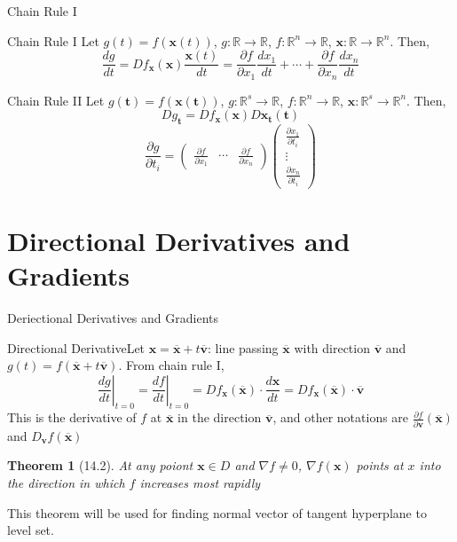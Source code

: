 \documentclass[a4paper,11pt]{article}
\newtheorem{thm}{Theorem}
\newcommand{\bb}{\mathbb}
\newcommand{\bd}{\mathbf}
\newcommand{\p}{\partial}
\begin{document}
\begin{frame}[t]{Chain Rule I}
	\begin{block}
		{Chain Rule I}
		Let $g(t)=f(\bd{x}(t))$, $g:\bb{R}\rightarrow\bb{R}$, $f:\bb{R}^n\rightarrow\bb{R}$, $\bd x :\bb{R}\rightarrow\bb{R}^n$. Then, \[
			\frac{d g}{dt} = Df_{\bd x}(\bd x) \frac {\bd x(t)}{dt} = \frac{\p f}{\p x_1}\frac{dx_1}{dt}+ \cdots +\frac{\p f}{\p x_n}\frac{dx_n}{dt}
		\]
	\end{block}
	\begin{block}
		{Chain Rule II}
		Let $g(\bd t)=f(\bd{x}(\bd t))$, $g:\bb{R}^s\rightarrow\bb{R}$, $f:\bb{R}^n\rightarrow\bb{R}$, $\bd x :\bb{R}^s\rightarrow\bb{R}^n$. Then, \[
			Dg_{\bd t} = Df_{\bd x}(\bd x) D {\bd x_{\bd t}(\bd t)} 
			\]\[
				\frac{\p g}{\p t_i} = \begin{pmatrix}
					\frac{\p f}{\p x_1} & \cdots & \frac{\p f}{\p x_n}
				\end{pmatrix}\begin{pmatrix}
					\frac{\p x_1 }{\p t_i}\\
					\vdots\\
					\frac{\p x_n }{\p t_i}
				\end{pmatrix}
			\]
	\end{block}
\end{frame}
\section{Directional Derivatives and Gradients} %
\label{sec:directional_derivatives_and_gradients}
\begin{frame}[t]{Deriectional Derivatives and Gradients}
	\begin{block}
		{Directional Derivative}Let $\bd x = \overline{\bd x} + t \overline{\bd v}$: line passing $\overline{\bd x}$ with direction $\overline{\bd v}$ and $g(t) = f(\overline{\bd x} + t \overline{\bd v})$. From chain rule I, \[
			\left.\frac{dg}{dt}\right\vert_{t=0} = \left.\frac{df}{dt}\right\vert_{t=0}= Df_{\bd x} (\overline{\bd x}) \cdot \frac{d\bd x}{dt} = Df_{\bd x} (\overline{\bd x})\cdot\overline{\bd v}
		\]This is the derivative of $f$ at $\overline{\bd x}$ in the direction $\overline{\bd v}$, and other notations are $\frac{\p f}{\p \bd v}(\overline{\bd x})$ and $D_{\bd v}f(\overline{\bd x})$
	\end{block}
	\begin{thm}
		[14.2] At any poiont $\bd x\in D$ and $\nabla f \neq 0$, $\nabla f(\bd x)$ points at $x$ into the direction in which $f$ increases most rapidly
	\end{thm}
	This theorem will be used for finding normal vector of tangent hyperplane to level set. 
\end{frame}
\end{document}
